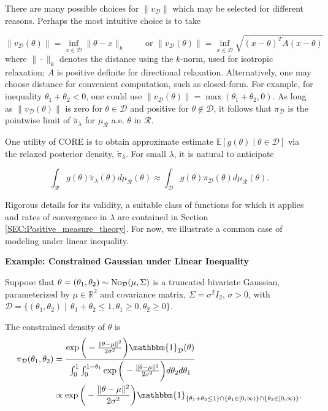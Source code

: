 \documentclass[10pt,fleqn]{article} \pdfoutput=1
\newcommand{\bb}[1]{\mathbb{#1}} \newcommand{\mc}[1]{\mathcal{#1}}
\DeclareMathOperator{\1}{\mathbbm{1}} \DeclareMathOperator{\bigO}{\mc O}
\begin{document}
There are many possible choices for $\|v_{\mathcal D}\|$ which may be selected for
different reasons.  Perhaps the most intuitive choice is to take

$$	 
\|v_{\mc D}(\theta)\| =
	\inf_{x\in\mathcal{D}} \|\theta-x\|_k
\qquad	\text{ or }
 \|v_{\mc D}(\theta)\| = \inf_{x\in\mathcal{D}}
	\sqrt{(x-\theta)^T A (x-\theta)}$$
where $\|\cdot\|_k$ denotes the distance using the $k$-norm, used for
isotropic relaxation; $A$ is positive definite for directional
relaxation. Alternatively, one may choose distance for convenient
computation, such as closed-form. For example, for
inequality $\theta_1+\theta_2<0$, one could
use $\|v_{\mc D}(\theta)\|=\max(\theta_1+\theta_2,0)$. As long as $\|v_{\mc D}(\theta)\|$ is zero for $\theta \in \mathcal{D}$ and positive
for $\theta\not\in\mathcal{D}$, it follows that $\pi_\mathcal{D}$ is the
pointwise limit of $\tilde{\pi}_\lambda$ for $\mu_\mathcal{R}$ a.e.
$\theta$ in $\mathcal{R}.$ 

One utility of CORE is to obtain approximate estimate
$\bb E[g(\theta) \mid \theta\in\mathcal{D}]$ via the relaxed
posterior density, $\tilde{\pi}_\lambda$. For small $\lambda$, it is
natural to anticipate

$$\int_\mathcal{R} g(\theta)\tilde{\pi}_\lambda(\theta)
	d\mu_\mathcal{R}(\theta) \approx \int_\mathcal{D}
	g(\theta)\pi_\mathcal{D}(\theta) d\mu_\mathcal{R}(\theta) .$$

Rigorous
details for its validity, a suitable class of
functions for which it applies and rates of convergence in $\lambda$ are
contained in Section \ref{SEC:Positive_measure_theory}. For now, we
illustrate a common case of modeling under linear inequality.

\textbf{Example: Constrained Gaussian  under Linear Inequality}

Suppose that $\theta = (\theta_1,\theta_2)\sim \No_{\mc D}(\mu, \Sigma)$ is a truncated bivariate
Gaussian, parameterized by $\mu \in\mathbb{R}^2$ and covariance matrix, $\Sigma = \sigma^2
	I_2$, $\sigma > 0$, with $\mathcal{D} = \{(\theta_1,\theta_2) \mid  \, \theta_1+\theta_2\le 1,
	\theta_1\ge0, \theta_2 \ge 0\}.$

 The constrained density of $\theta$
 is \begin{align*}
	\pi_\mathcal{D}(\theta_1,\theta_2)
	& =
	\frac{\exp\bigg(-\frac{\|\theta-\mu\|^2}{2\sigma^2}\bigg)\mathbbm{1}_\mathcal{D}(\theta)}{\int_0^1\int_0^{1-\theta_1}\exp\bigg(-\frac{\|\theta-\mu\|^2}{2\sigma^2}\bigg)d\theta_2d\theta_1} \\
	                                            & \propto \exp\bigg(-\frac{\|\theta-\mu\|^2}{2\sigma^2}\bigg)
	\mathbbm{1}_{\{\theta_1+\theta_2\le 1\}\cap \{\theta_1 \in
	[0,\infty)\}\cap \{\theta_2\in[0,\infty)\}} .\end{align*}
\end{document}
